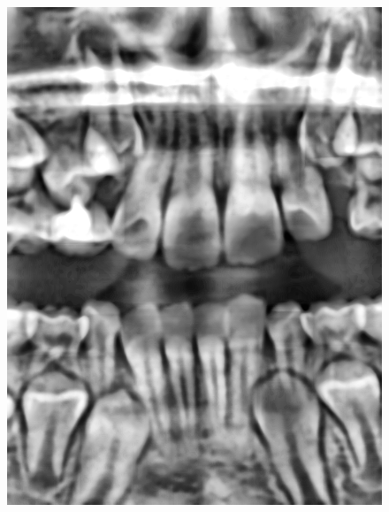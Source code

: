 \documentclass[a4paper,titlepage,12pt]{article}
\begin{document}
\begin{figure}
\begin{minipage}[b]{0.23\linewidth}
		\includegraphics[width=\linewidth]{preprocess/clahe.png}
	\end{minipage}
	\begin{minipage}[b]{0.23\linewidth}

\end{minipage}
\end{figure}
\end{document}

